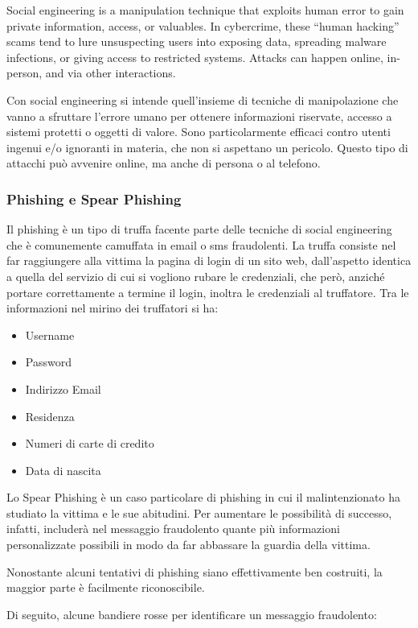 Social engineering is a manipulation technique that exploits human error to gain private information, access, or valuables. In cybercrime, these “human hacking” scams tend to lure unsuspecting users into exposing data, spreading malware infections, or giving access to restricted systems. Attacks can happen online, in-person, and via other interactions.

Con social engineering si intende quell'insieme di tecniche di manipolazione che vanno a sfruttare l'errore umano per ottenere informazioni riservate, accesso a sistemi protetti o oggetti di valore. Sono particolarmente efficaci contro utenti ingenui e/o ignoranti in materia, che non si aspettano un pericolo. Questo tipo di attacchi può avvenire online, ma anche di persona o al telefono.

\subsubsection{Phishing e Spear Phishing}

Il phishing è un tipo di truffa facente parte delle tecniche di social engineering che è comunemente camuffata in email o sms fraudolenti. La truffa consiste nel far raggiungere alla vittima la pagina di login di un sito web, dall'aspetto identica a quella del servizio di cui si vogliono rubare le credenziali, che però, anziché portare correttamente a termine il login, inoltra le credenziali al truffatore.
Tra le informazioni nel mirino dei truffatori si ha:
\begin{itemize}
    \item Username
    \item Password
    \item Indirizzo Email
    \item Residenza
    \item Numeri di carte di credito
    \item Data di nascita
\end{itemize}

Lo Spear Phishing è un caso particolare di phishing in cui il malintenzionato ha studiato la vittima e le sue abitudini. Per aumentare le possibilità di successo, infatti, includerà nel messaggio fraudolento quante più informazioni personalizzate possibili in modo da far abbassare la guardia della vittima.

Nonostante alcuni tentativi di phishing siano effettivamente ben costruiti, la maggior parte è facilmente riconoscibile.

Di seguito, alcune bandiere rosse per identificare un messaggio fraudolento:

